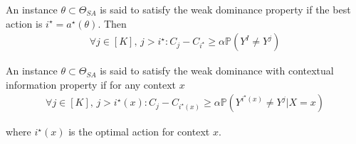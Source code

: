 \begin{define}  An instance $\theta \subset \Theta_{SA}$ is said to satisfy the weak dominance property if the best action is $i^\star = a^\star(\theta)$. Then	
	\begin{align} \label{equ:WD}
	\forall j \in [K], \, j > i^\star : C_j - C_{i^\star} \geq \alpha\mathbb{P}(Y^{I} \neq Y^j)
	\end{align}
	
	
\end{define} 

\begin{define} An instance $\theta \subset \Theta_{SA}$ is said to satisfy the weak dominance with contextual information property if for any context $x$
	\begin{align} \label{equ:WDC}
	\forall j \in [K], \, j > i^\star(x) : C_j - C_{i^\star(x)} \geq \alpha\mathbb{P}(Y^{i^\star(x)} \neq Y^j|X=x)
	\end{align}
\end{define} 
where $i^\star(x)$ is the optimal action for context $x$.

